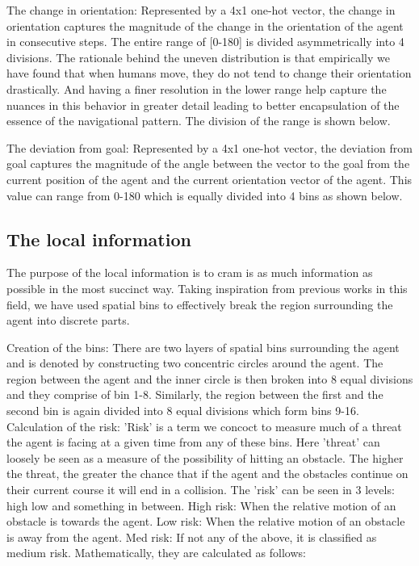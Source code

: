 The change in orientation: Represented by a 4x1 one-hot vector, the change in orientation captures the magnitude of the change in the orientation of the agent in consecutive steps. The entire range of [0-180] is divided asymmetrically into 4 divisions. The rationale behind the uneven distribution is that empirically we have found that when humans move,  they do not tend to change their orientation drastically. And having a finer resolution in the lower range help capture the nuances in this behavior in greater detail leading to better encapsulation of the essence of the navigational pattern. The division of the range is shown below.

The deviation from goal: Represented by a 4x1 one-hot vector, the deviation from goal captures the magnitude of the angle between the vector to the goal from the current position of the agent and the current orientation vector of the agent. This value can range from 0-180 which is equally divided into 4 bins as shown below.

\subsection*{The local information}
The purpose of the local information is to cram is as much information as possible in the most succinct way. Taking inspiration from previous works in this field, we have used spatial bins to effectively break the region surrounding the agent into discrete parts.

Creation of the bins:
There are two layers of spatial bins surrounding the agent and is denoted by constructing two concentric circles around the agent. The region between the agent and the inner circle is then broken into 8 equal divisions and they comprise of bin 1-8. Similarly, the region between the first and the second bin is again divided into 8 equal divisions which form bins 9-16.
Calculation of the risk:
'Risk' is a term we concoct to measure much of a  threat the agent is facing at a given time from any of these bins. Here 'threat' can loosely be seen as a measure of the possibility of hitting an obstacle. The higher the threat, the greater the chance that if the agent and the obstacles continue on their current course it will end in a collision.
The 'risk' can be seen in 3 levels:
high low and something in between.
High risk:
When the relative motion of an obstacle is towards the agent.
Low risk:
When the relative motion of an obstacle is away from the agent.
Med risk:
If not any of the above, it is classified as medium risk.
Mathematically, they are calculated as follows:

